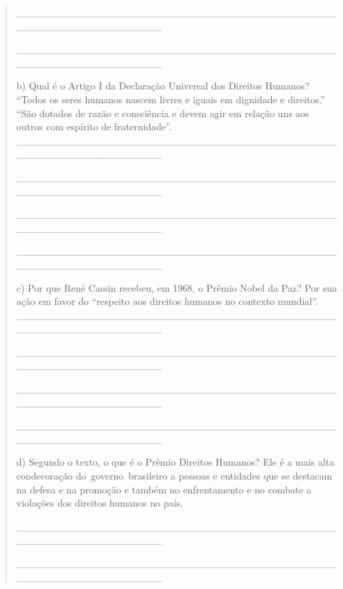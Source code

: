 \begin{itemize}
{{{\begin{itemize}
\begin{itemize}
\begin{itemize}
\begin{quote}
\_\_\_\_\_\_\_\_\_\_\_\_\_\_\_\_\_\_\_\_\_\_\_\_\_\_\_\_\_\_\_\_\_\_\_\_\_\_\_\_\_\_\_\_\_\_\_\_\_\_\_\_\_\_\_\_\_\_\_\_\_\_\_\_

\_\_\_\_\_\_\_\_\_\_\_\_\_\_\_\_\_\_\_\_\_\_\_\_\_\_\_\_\_\_\_\_\_\_\_\_\_\_\_\_\_\_\_\_\_\_\_\_\_\_\_\_\_\_\_\_\_\_\_\_\_\_\_\_

b) Qual é o Artigo I da Declaração Universal dos Direitos Humanos?
``Todos os seres humanos nascem livres e iguais em dignidade e
direitos.'' ``São dotados de razão e consciência e devem agir em relação
uns aos outros com espírito de fraternidade''.
\_\_\_\_\_\_\_\_\_\_\_\_\_\_\_\_\_\_\_\_\_\_\_\_\_\_\_\_\_\_\_\_\_\_\_\_\_\_\_\_\_\_\_\_\_\_\_\_\_\_\_\_\_\_\_\_\_\_\_\_\_\_\_\_

\_\_\_\_\_\_\_\_\_\_\_\_\_\_\_\_\_\_\_\_\_\_\_\_\_\_\_\_\_\_\_\_\_\_\_\_\_\_\_\_\_\_\_\_\_\_\_\_\_\_\_\_\_\_\_\_\_\_\_\_\_\_\_\_

\_\_\_\_\_\_\_\_\_\_\_\_\_\_\_\_\_\_\_\_\_\_\_\_\_\_\_\_\_\_\_\_\_\_\_\_\_\_\_\_\_\_\_\_\_\_\_\_\_\_\_\_\_\_\_\_\_\_\_\_\_\_\_\_

\_\_\_\_\_\_\_\_\_\_\_\_\_\_\_\_\_\_\_\_\_\_\_\_\_\_\_\_\_\_\_\_\_\_\_\_\_\_\_\_\_\_\_\_\_\_\_\_\_\_\_\_\_\_\_\_\_\_\_\_\_\_\_\_

c) Por que René Cassin recebeu, em 1968, o Prêmio Nobel da Paz? Por sua
ação em favor do ``respeito aos direitos humanos no contexto mundial''.
\_\_\_\_\_\_\_\_\_\_\_\_\_\_\_\_\_\_\_\_\_\_\_\_\_\_\_\_\_\_\_\_\_\_\_\_\_\_\_\_\_\_\_\_\_\_\_\_\_\_\_\_\_\_\_\_\_\_\_\_\_\_\_\_

\_\_\_\_\_\_\_\_\_\_\_\_\_\_\_\_\_\_\_\_\_\_\_\_\_\_\_\_\_\_\_\_\_\_\_\_\_\_\_\_\_\_\_\_\_\_\_\_\_\_\_\_\_\_\_\_\_\_\_\_\_\_\_\_

\_\_\_\_\_\_\_\_\_\_\_\_\_\_\_\_\_\_\_\_\_\_\_\_\_\_\_\_\_\_\_\_\_\_\_\_\_\_\_\_\_\_\_\_\_\_\_\_\_\_\_\_\_\_\_\_\_\_\_\_\_\_\_\_

\_\_\_\_\_\_\_\_\_\_\_\_\_\_\_\_\_\_\_\_\_\_\_\_\_\_\_\_\_\_\_\_\_\_\_\_\_\_\_\_\_\_\_\_\_\_\_\_\_\_\_\_\_\_\_\_\_\_\_\_\_\_\_\_

d) Segundo o texto, o que é o Prêmio Direitos Humanos? Ele é a mais alta
condecoração do~governo~brasileiro a pessoas e entidades que se destacam
na defesa e na promoção e também no enfrentamento e no combate a
violações dos direitos humanos no país.

\_\_\_\_\_\_\_\_\_\_\_\_\_\_\_\_\_\_\_\_\_\_\_\_\_\_\_\_\_\_\_\_\_\_\_\_\_\_\_\_\_\_\_\_\_\_\_\_\_\_\_\_\_\_\_\_\_\_\_\_\_\_\_\_

\_\_\_\_\_\_\_\_\_\_\_\_\_\_\_\_\_\_\_\_\_\_\_\_\_\_\_\_\_\_\_\_\_\_\_\_\_\_\_\_\_\_\_\_\_\_\_\_\_\_\_\_\_\_\_\_\_\_\_\_\_\_\_\_


\end{quote}
\end{itemize}
\end{itemize}
\end{itemize}}}}
\end{itemize}
